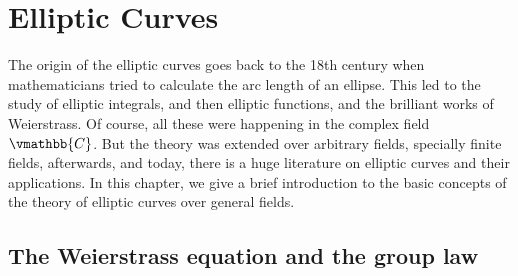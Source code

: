 \chapter{Elliptic Curves}
\label{chapter:ellibase}

The origin of the elliptic curves goes back to the 18th century when mathematicians tried to 
calculate the arc length of an ellipse. This led to the study of elliptic integrals, and then 
elliptic functions, and the brilliant works of Weierstrass. Of course, all these were happening in 
the complex field $\vmathbb{C}$. But the theory was extended over arbitrary fields, specially finite 
fields, afterwards, and today, there is a huge literature on elliptic curves and their applications. 
In this chapter, we give a brief introduction to the basic concepts of the theory of elliptic curves 
over general fields. 







\section{The Weierstrass equation and the group law}
\label{section:W-grouplaw}

